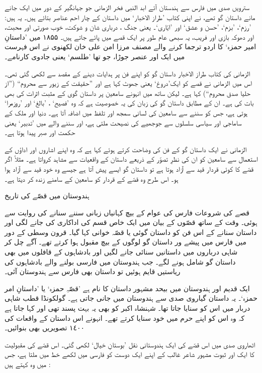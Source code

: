 \documentclass[a4paper]{article}
\newcommand{\subtitle}[1]{\begingroup\fontsize{24pt}{12pt}\titlefont #1\endgroup\nopagebreak}
\begin{document}
سترویں صدی میں فارس سے ہندستان آئے ابد النبی فخر الزمانی جو جہانگیر کے دور میں ایک جانے مانے داستان گو تھے، نے اپنی کتاب ’طراز الاخبار‘ میں داستان کے چار احم عناصر بتائے ہیں۔ یہ ہیں: ’رزم‘، ’بزم‘، ’حسن و عشق‘ اور ’ایّاری‘۔ یعنی جنگ ،  درباری شان و شوکت، خوب صورتی اور محبت، اور  دھوکہ بازی اور فریب، یہ سبھی عام طور پر ایک قصے میں پائے جاتے ہیں۔ ۱۸۵۵ میں ’داستانِ امیر حمزہ‘ کا اردو ترجما کرنے والے مصنف مرزا امن علی خان لکھنوی نے اس فہرست میں ایک اور عنصر جوڑا، جو تھا ’طلسم‘ یعنی جادوی کارنامے۔

الزمانی کی کتاب طراز الاخبار داستان گو کو اپنے فن پر ہدایات دینے کے مقصد سے لکھی گئی تھی۔ اس میں الزمانی نے قصے کو ایک’دروغ‘ یعنی جھوٹ کہا ہے اور ”حقیقت کے زیور سے محروم“ (”از حلیا صدق محروم“) کہا ہے۔  لیکن ساتھ میں انہونے سامعین پر داستان گوی  کے مثبت اثرات کی بھی بات کی ہے۔ ان کے مطابق داستان گو کی زبان کی یہ خصوصیت ہے کہ وہ ’فصیح‘ ، ’بالغ‘ اور ’روزمرا‘ ہوتی ہے، جس کو سننے سے سامعین کی لسانی سمجھ اور تلفظ میں اضافہ آتا ہے۔ دنیا اور ملک کے ساماجی اور سیاسی سلسلوں  سے جوجھیے کی نصیحت ملتی ہے، اور سننے والے میں ’تدبیر‘ یعنی حکمت اور صبر پیدا ہوتا ہے۔

الزمانی نے ایک داستان گو کے فن کی  وضاحت  کرتے ہوئے کہا ہے کہ وہ اپنے اشاروں اور اداؤں کے استعمال سے سامعین کو ان کی نظرِ تصوّر کے ذریعے داستان کے واقعیات سے مشاہد کرواتا ہے۔ مثلاً اگر قصّے کا کوئی قردار قید سے آزاد ہوتا ہے تو داستان گو ایسے پیش آتا ہے  جیسے وہ خود قید سے آزاد ہوا ہو۔ اس طرح وہ قصّے کے قردار  کو سامعین کے سامنے زندہ کر دیتا ہے۔ 

\subtitle{ہندوستان میں قصّے کی تاریخ}

قصے کی شروعات فارس کی عوام کے بیچ کہانیاں زبانی سننے سنانے کی روایت سے ہوئی۔ وقت کے ساتھ قصّوں کے بیان  میں ایک خاص قسم کی اداکاری کی جانے لگی اور داستان سنانے کے اس فن کو داستان گوئی یا قصّہ خوانی  کہا  گیا۔ قرون وسطی کے دور میں فارس میں پیشے ور داستان گو لوگوں کے بیچ مقبول ہوا کرتے تھے۔ آگے چل کر شاہی درباروں میں داستانیں سنائی جانے لگیں اور بادشاہوں کے قافلوں میں بھی داستان گو شامل ہونے لگے۔ جب ہندوستان میں فارسی بولنے والے بادشاہوں کی ریاستیں قایم ہوئیں تو داستان بھی فارس سے ہندوستان آئی۔

ایک قدیم اور ہندوستان میں بیحد مشہور داستان کا نام ہے ’قصّہِ حمزہ‘ یا ’داستانِ امر حمزہ‘۔ یہ داستان گیاروی صدی سے ہندوستان میں جانی جاتی ہے۔ گولکونڈا قطب شاہی دربار میں اس کو سنایا جاتا تھا۔ شہنشاہ اکبر کو بھی یہ بہت پسند تھی اور کہا جاتا ہے کہ وہ اس کو اپنے حرم میں خود سنایا کرتے تھے۔ انہونے اس داستان کے واقعات کی ١٤٠٠ تصویریں بھی بنوائیں۔

 اٹھاروی صدی میں اس قصّے کی ایک ہندوستانی نقل ’بوستانِ خیال‘  لکھی گئی۔ اس قصّے کی مقبولیت کا ایک اور ثبوت مشہور شاعر غالب کے اپنے ایک دوست کو فارسی میں لکھے خط میں ملتا ہے، جس میں وہ کہتے ہیں :
\end{document}
